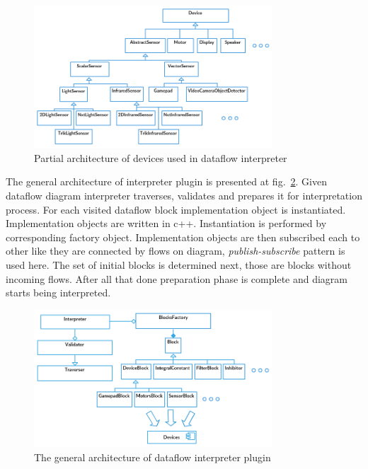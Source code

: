 \documentclass[conference,compsoc]{IEEEtran}
\begin{document}
\begin{figure}[ht]
	\centering
	\includegraphics[width=3.5in]{Devices.png}
	\caption{Partial architecture of devices used in dataflow interpreter}
	\label{image:devices-architecture}
\end{figure}

The general architecture of interpreter plugin is presented at fig.~\ref{image:interpreter-architecture}. Given dataflow diagram interpreter traverses, validates and prepares it for interpretation process. For each visited dataflow block implementation object is instantiated. Implementation objects are written in c++. Instantiation is performed by corresponding factory object. Implementation objects are then subscribed each to other like they are connected by flows on diagram, \textit{publish-subscribe} pattern is used here. The set of initial blocks is determined next, those are blocks without incoming flows. After all that done preparation phase is complete and diagram starts being interpreted.

\begin{figure}[ht]
	\centering
	\includegraphics[width=3.5in]{Interpreter.png}
	\caption{The general architecture of dataflow interpreter plugin}
	\label{image:interpreter-architecture}
\end{figure}
\end{document}
